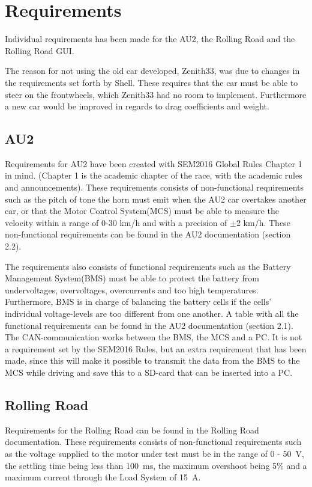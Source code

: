 \chapter{Requirements}
Individual requirements has been made for the AU2, the Rolling Road and the Rolling Road GUI.

The reason for not using the old car developed, Zenith33, was due to changes in the requirements set forth by Shell. These requires that the car must be able to steer on the frontwheels, which Zenith33 had no room to implement. Furthermore a new car would be improved in regards to drag coefficients and weight.

\section{AU2}
Requirements for AU2 have been created with SEM2016 Global Rules Chapter 1\cite{ShellRequirements} in mind. (Chapter 1 is the academic chapter of the race, with the academic rules and announcements). These requirements consists of non-functional requirements such as the pitch of tone the horn must emit when the AU2 car overtakes another car, or that the Motor Control System(MCS) must be able to measure the velocity within a range of 0-30 km/h and with a precision of $\pm$2 km/h. These non-functional requirements can be found in the AU2 documentation\cite{AU2} (section 2.2). 

The requirements also consists of functional requirements such as the Battery Management System(BMS) must be able to protect the battery from undervoltages, overvoltages, overcurrents and too high temperatures. Furthermore, BMS is in charge of balancing the battery cells if the cells' individual voltage-levels are too different from one another. A table with all the functional requirements can be found in the AU2 documentation\cite{AU2} (section 2.1). The CAN-communication works between the BMS, the MCS and a PC. It is not a requirement set by the SEM2016 Rules, but an extra requirement that has been made, since this will make it possible to transmit the data from the BMS to the MCS while driving and save this to a SD-card that can be inserted into a PC.

\section{Rolling Road}
Requirements for the Rolling Road can be found in the Rolling Road documentation\cite{RR}.
These requirements consists of non-functional requirements such as the voltage supplied to the motor under test must be in the range of 0 - \SI{50}{\volt}, the settling time being less than \SI{100}{\milli \second}, the maximum overshoot being 5\% and a maximum current through the Load System of \SI{15}{\ampere}.

